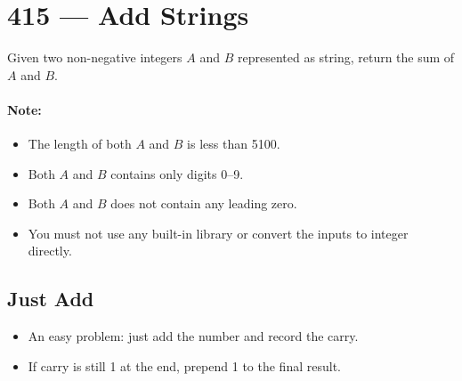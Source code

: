 \section{415 --- Add Strings}
Given two non-negative integers $A$ and $B$ represented as string, return the sum of $A$ and $B$.

\paragraph{Note:}

\begin{itemize}
\item  The length of both $A$ and $B$ is less than 5100.
\item Both $A$ and $B$ contains only digits 0--9.
\item Both $A$ and $B$ does not contain any leading zero.
\item You must not use any built-in library or convert the inputs to integer directly.
\end{itemize}

\subsection{Just Add}
\begin{itemize}
\item An easy problem: just add the number and record the carry.
\item If carry is still 1 at the end, prepend 1 to the final result.
\end{itemize}

